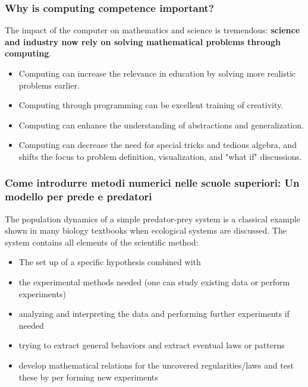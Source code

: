 \documentclass{beamer}
\begin{document}
\begin{frame}
\frametitle{Why is computing competence important?}

The impact of the computer on mathematics and science is tremendous: \textbf{science and industry now rely on solving mathematical problems through computing}.
\begin{itemize}
\item Computing can increase the relevance in education by solving more realistic problems earlier.

\item Computing through programming can be excellent training of creativity.

\item Computing can enhance the understanding of abstractions and generalization.

\item Computing can decrease the need for special tricks and tedious algebra, and shifts the focus to problem definition, visualization, and "what if" discussions.
\end{itemize}

\noindent
\end{frame}

\begin{frame}
\frametitle{Come introdurre metodi numerici nelle scuole superiori: Un modello per prede e predatori}

\begin{block}{}
The population dynamics of a simple predator-prey system is a
classical example shown in many biology textbooks when ecological
systems are discussed. The system contains all elements of the
scientific method:

\begin{itemize}
 \item The set up of a specific hypothesis combined with

 \item the experimental methods needed (one can study existing data or perform experiments)

 \item analyzing and interpreting the data and performing further experiments if needed

 \item trying to extract general behaviors and extract eventual laws or patterns

 \item develop mathematical relations for the uncovered regularities/laws and test these by per forming new experiments
\end{itemize}

\noindent
\end{block}
\end{frame}
\end{document}
